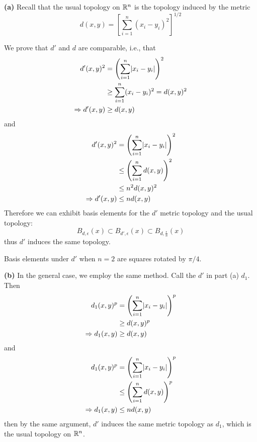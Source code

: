 \documentclass[a4paper, 12pt]{article}
\begin{document}
\begin{solution}
    \textbf{(a)}
    Recall that the usual topology on $\mathbb{R}^n$ is the topology induced by the metric \begin{equation*}
    d(x, y) = \left[\sum_{i=1}^{n} (x_i - y_i)^2\right]^{1/2}
    \end{equation*}
    
    We prove that $d'$ and $d$ are comparable, i.e., that \begin{align*}
    d'(x, y)^2 &= \left(\sum_{i=1}^{n} \lvert x_i - y_i\rvert\right)^2 \\
                &\geq \sum_{i=1}^{n} (x_i - y_i)^2 = d(x, y)^2 \\
    \Rightarrow d'(x, y) & \geq d(x, y) \\
\end{align*}
and 
\begin{align*}
    d'(x, y)^2 &= \left(\sum_{i=1}^{n} \lvert x_i - y_i\rvert\right)^2 \\
        &\leq \left(\sum_{i=1}^{n} d(x, y)\right)^2 \\
        &\leq n^2d(x, y)^2 \\
    \Rightarrow d'(x, y) &\leq n d(x, y)
\end{align*}
Therefore we can exhibit basis elements for the $d'$ metric topology and the usual topology:
\begin{equation*}
B_{d, \epsilon}(x) \subset B_{d', \epsilon}(x) \subset B_{d, \frac{\epsilon}{n}}(x)
\end{equation*}
thus $d'$ induces the same topology.

Basis elements under $d'$ when $n=2$ are squares rotated by $\pi/4$.

\textbf{(b)} In the general case, we employ the same method. Call the $d'$ in part (a) $d_1$. Then
\begin{align*}
d_1(x, y)^p &=  \left(\sum_{i=1}^{n} \lvert x_i - y_i\rvert\right)^p \\
&\geq d(x, y)^p \\
\Rightarrow d_1(x, y) &\geq d(x, y) 
\end{align*}
and 
\begin{align*}
    d_1(x, y)^p  &= \left(\sum_{i=1}^{n} \lvert x_i - y_i\rvert\right)^p  \\
    &\leq \left(\sum_{i=1}^{n} d(x,y) \right)^p \\
    \Rightarrow d_1(x, y) &\leq n d(x, y)
\end{align*}
then by the same argument, $d'$ induces the same metric topology as $d_1$, which is the usual topology on $\mathbb{R}^n$.
\end{solution}
\end{document}
